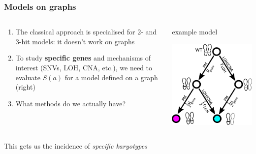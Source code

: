\documentclass{beamer}
\begin{document}
\begin{frame}
    \frametitle{Models on graphs}
    \begin{columns}
        \begin{column}{0.5\textwidth}
        \begin{enumerate}
            \item The classical approach is specialised for 2- and 3-hit models:
            it doesn't work on graphs
            \item To study \textbf{specific genes} and mechanisms of interest
            (SNVs, LOH, CNA, etc.), we need to evaluate $S(a)$ for a model
            defined on a graph (right)
            \item What methods do we actually have?
        \end{enumerate}
        \end{column}
        \begin{column}{0.5\textwidth}
        \begin{center}
            \small{example model}
        \end{center}
            \includegraphics[width=\textwidth]{figures/diagram4}
        \end{column}
    \end{columns}

    \;

    \begin{center}
        This gets us the incidence of \emph{specific karyotypes}
    \end{center}
\end{frame}
\end{document}
